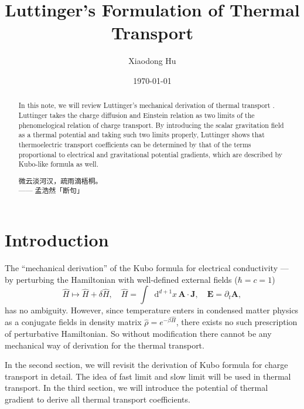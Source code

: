 \documentclass[10pt,nofootinbib,letterpaper]{revtex4}
\newcommand*{\kaishu}{\CJKfamily{kaishu}}
\newcommand*\dd{\mathop{}\!\mathrm{d}}
\begin{document}
\title{Luttinger's Formulation of Thermal Transport}
\author{Xiaodong Hu}

\date{\today}

\begin{abstract}
	In this note, we will review Luttinger's mechanical derivation of thermal transport \cite{luttinger1964theory}. Luttinger takes the charge diffusion and Einstein relation as two limits of the phenomelogical relation of charge transport. By introducing the scalar gravitation field as a thermal potential and taking such two limits properly, Luttinger shows that thermoelectric transport coefficients can be determined by that of the terms proportional to electrical and gravitational potential gradients, which are described by Kubo-like formula as well.\par
		\hfill\par
		{\centering\kaishu 微云淡河汉，疏雨滴梧桐。\\[0.5em]}
	\hfill------ 孟浩然「断句」
\end{abstract}

\maketitle
\tableofcontents

\section{Introduction}
	The ``mechanical derivation'' of the Kubo formula for electrical conductivity --- by perturbing the Hamiltonian with well-defined external fields ($\hbar=c=1$)
	\begin{equation*}
		\hat H\mapsto\hat H+\delta\hat H,\quad\hat H=\int\dd^{d+1}x\,\bm{A}\cdot\bm{J},\quad \bm{E}=\partial_t\bm{A},
	\end{equation*}
	has no ambiguity. However, {\color{red}since temperature enters in condensed matter physics as a conjugate fields in density matrix $\hat\rho=e^{-\beta\hat H}$, there exists no such prescription of perturbative Hamiltonian. So without modification there cannot be any mechanical way of derivation for the thermal transport}.\par

	In the second section, we will revisit the derivation of Kubo formula for charge transport in detail. The idea of fast limit and slow limit will be used in thermal transport. In the third section, we will introduce the potential of thermal gradient to derive all thermal transport coefficients.
\end{document}
